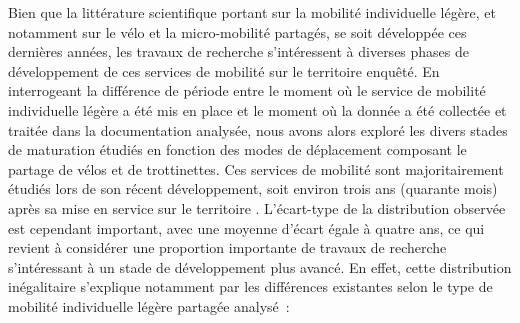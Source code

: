 \begin{refsegment}
Bien que la littérature scientifique portant sur la mobilité individuelle légère, et notamment sur le vélo et la micro-mobilité partagés, se soit développée ces dernières années, les travaux de recherche s'intéressent à diverses phases de développement de ces services de mobilité sur le territoire enquêté. En interrogeant la différence de période entre le moment où le service de mobilité individuelle légère a été mis en place et le moment où la donnée a été collectée et traitée dans la documentation analysée, nous avons alors exploré les divers stades de maturation étudiés en fonction des modes de déplacement composant le partage de vélos et de trottinettes. Ces services de mobilité sont majoritairement étudiés lors de son récent développement, soit environ trois ans (quarante mois) après sa mise en service sur le territoire \textcolor{blue}{\autocite[298]{zhang_built_2023}}. L'écart-type de la distribution observée est cependant important, avec une moyenne d'écart égale à quatre ans, ce qui revient à considérer une proportion importante de travaux de recherche s'intéressant à un stade de développement plus avancé. En effet, cette distribution inégalitaire s'explique notamment par les différences existantes selon le type de mobilité individuelle légère partagée analysé~:
    \begin{customitemize}

\end{customitemize}
\end{refsegment}

